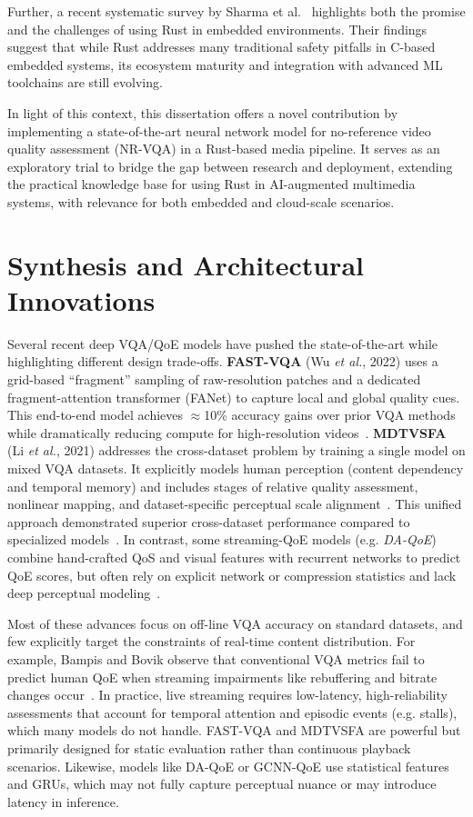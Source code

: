 Further, a recent systematic survey by Sharma et al.~\cite{sharma2023rust} highlights both the promise and the challenges of using Rust in embedded environments. Their findings suggest that while Rust addresses many traditional safety pitfalls in C-based embedded systems, its ecosystem maturity and integration with advanced ML toolchains are still evolving.

In light of this context, this dissertation offers a novel contribution by implementing a state-of-the-art neural network model for no-reference video quality assessment (NR-VQA) in a Rust-based media pipeline. It serves as an exploratory trial to bridge the gap between research and deployment, extending the practical knowledge base for using Rust in AI-augmented multimedia systems, with relevance for both embedded and cloud-scale scenarios.

\section{Synthesis and Architectural Innovations}

Several recent deep VQA/QoE models have pushed the state-of-the-art while highlighting different design trade‑offs. \textbf{FAST-VQA} (Wu \textit{et al.}, 2022) uses a grid-based ``fragment'' sampling of raw-resolution patches and a dedicated fragment-attention transformer (FANet) to capture local and global quality cues. This end-to-end model achieves $\approx$10\% accuracy gains over prior VQA methods while dramatically reducing compute for high-resolution videos~\cite{wu2022fastvqa}. \textbf{MDTVSFA} (Li \textit{et al.}, 2021) addresses the cross-dataset problem by training a single model on mixed VQA datasets. It explicitly models human perception (content dependency and temporal memory) and includes stages of relative quality assessment, nonlinear mapping, and dataset-specific perceptual scale alignment~\cite{li2023unified}. This unified approach demonstrated superior cross-dataset performance compared to specialized models~\cite{li2023unified}. In contrast, some streaming-QoE models (e.g. \textit{DA-QoE}) combine hand-crafted QoS and visual features with recurrent networks to predict QoE scores, but often rely on explicit network or compression statistics and lack deep perceptual modeling~\cite{li2022weakly}.

Most of these advances focus on off-line VQA accuracy on standard datasets, and few explicitly target the constraints of real-time content distribution. For example, Bampis and Bovik observe that conventional VQA metrics fail to predict human QoE when streaming impairments like rebuffering and bitrate changes occur~\cite{BAMPIS2018218}. In practice, live streaming requires low-latency, high-reliability assessments that account for temporal attention and episodic events (e.g. stalls), which many models do not handle. FAST-VQA and MDTVSFA are powerful but primarily designed for static evaluation rather than continuous playback scenarios. Likewise, models like DA-QoE or GCNN-QoE use statistical features and GRUs, which may not fully capture perceptual nuance or may introduce latency in inference.

